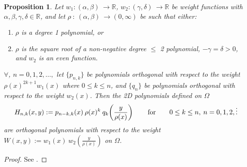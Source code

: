 \documentclass[11pt, oneside]{article}   	%
\newcommand{\R}{\mathbb{R}}
\newcommand{\hdop}{H}
\newcommand{\hdopnk}{\hdop_{n,k}}
\newtheorem{proposition}{Proposition}
\begin{document}
\begin{proposition}
Let \(w_1 : (\alpha,\beta) \: \to \R\), \(w_2 : (\gamma,\delta) \: \to \R\) be weight functions with \(\alpha,\beta,\gamma,\delta \in \R\), and let \(\rho \: : \: (\alpha,\beta) \: \to (0,\infty)\) be such that either:
\begin{enumerate}
\item  \(\rho\) is a degree 1 polynomial, or 
\item \(\rho\) is the square root of a non-negative degree \(\le\) 2 polynomial, \(-\gamma = \delta > 0\), and \(w_2\) is an even function.
\end{enumerate}
$\forall$, $n = 0,1,2,\dots, $ let $\{p_{n,k}\}$ be polynomials orthogonal with respect to the weight $\rho(x)^{2k+1} w_1(x)$ where $0 \le k \le n$, and $\{q_{n}\}$ be polynomials orthogonal with respect to the weight $w_2(x)$. Then the 2D polynomials defined on $\Omega$
$$
\hdopnk(x,y) := p_{n-k,k}(x) \: \rho(x)^k \: q_k\fpr(\frac{y}{\rho(x)}) \qquad\hbox{for} \qquad 0 \le k \le n, \: n = 0,1,2,\dots
$$
are orthogonal polynomials with respect to the weight \(W(x,y) := w_1(x) \: w_2(\frac{y}{\rho(x)}) \) on $\Omega$. 
\end{proposition}
\begin{proof}
See \cite[p55--56]{dunkl2014orthogonal}.
\end{proof}
\end{document}

